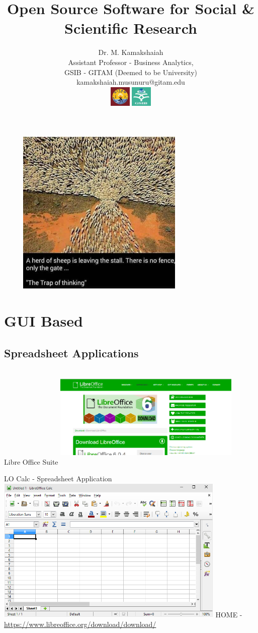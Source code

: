 \documentclass{beamer}
\title{Open Source Software for Social \& Scientific Research}
\author{Dr. M. Kamakshaiah \\ Assistant Professor - Business Analytics, \\ GSIB - GITAM \tiny{(Deemed to be University)} \\ \small{kamakshaiah.musunuru@gitam.edu} \\ \vspace{2cm} \includegraphics[height=1cm, width=1cm]{gitam_logo} \includegraphics[height=1cm, width=1cm]{gsib_logo}}
\date{}
\begin{document}
\titlepage 
\newpage
\tableofcontents

\begin{frame}
\centering 
\includegraphics[width=10cm, height=8cm]{goats}
\end{frame}


\section{GUI Based}

\subsection{Spreadsheet Applications}

\begin{frame}{Libre Office Suite}
\centering 
	\includegraphics[height=5cm, width=9cm]{lo}
\end{frame}

\begin{frame}{LO Calc - Spreadsheet Application}
\centering 
\includegraphics[height=7cm, width=11cm]{lo_calc}
HOME - \url{https://www.libreoffice.org/download/download/}
\end{frame}
\end{document}
